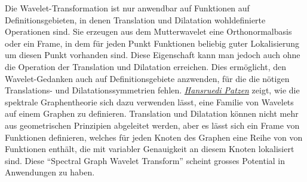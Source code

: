 Die Wavelet-Transformation ist nur anwendbar auf Funktionen auf
Definitionsgebieten, in denen Translation und Dilatation wohldefinierte
Operationen sind.
Sie erzeugen aus dem Mutterwavelet eine Orthonormalbasis oder ein Frame,
in dem für jeden Punkt Funktionen beliebig guter Lokalisierung um
diesen Punkt vorhanden sind.
Diese Eigenschaft kann man jedoch auch ohne die Operation der Translation
und Dilatation erreichen.
Dies ermöglicht, den Wavelet-Gedanken auch auf Definitionsgebiete
anzwenden, für die die nötigen Translations- und Dilatationssymmetrien fehlen.
\hyperref[chapter:sgwt]{\em Hansruedi Patzen} zeigt, wie die spektrale
Graphentheorie sich dazu verwenden lässt, eine Familie von Wavelets auf
einem Graphen zu definieren.
Translation und Dilatation können nicht mehr aus geometrischen Prinzipien
abgeleitet werden, aber es lässt sich ein Frame von Funktionen definieren,
welches für jeden Knoten des Graphen eine Reihe von von Funktionen enthält,
die mit variabler Genauigkeit an diesem Knoten lokalisiert sind.
Diese ``Spectral Graph Wavelet Transform'' scheint grosses Potential in
Anwendungen zu haben.





